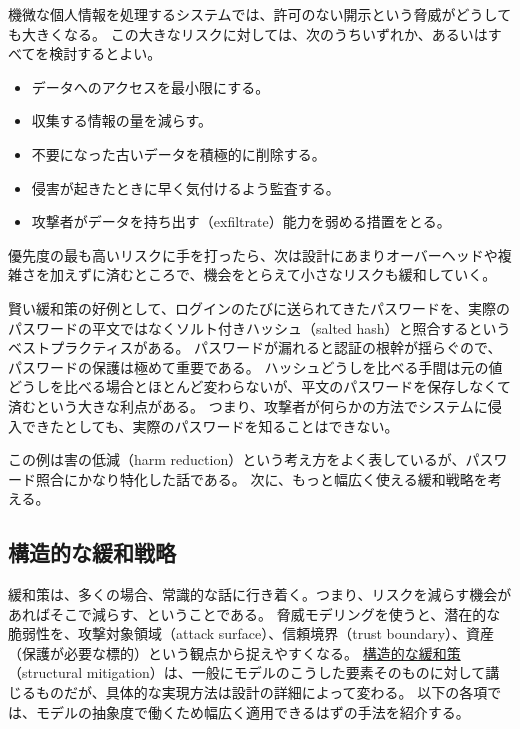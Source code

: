 \documentclass[uplatex]{jsarticle}
\def\label#1{}%
\begin{document}
\begin{exa}[機微な個人情報を扱うシステム]\label{exa:ch3-sensitive-personal-data}
機微な個人情報を処理するシステムでは、許可のない開示という脅威がどうしても大きくなる。
この大きなリスクに対しては、次のうちいずれか、あるいはすべてを検討するとよい。
\begin{itemize}
\item データへのアクセスを最小限にする。
\item 収集する情報の量を減らす。
\item 不要になった古いデータを積極的に削除する。
\item 侵害が起きたときに早く気付けるよう監査する。
\item 攻撃者がデータを持ち出す（exfiltrate）能力を弱める措置をとる。
\end{itemize}
\end{exa}

優先度の最も高いリスクに手を打ったら、次は設計にあまりオーバーヘッドや複雑さを加えずに済むところで、機会をとらえて小さなリスクも緩和していく。

\begin{exa}[ソルト付きハッシュによるパスワード照合]\label{exa:ch3-salted-hash}
賢い緩和策の好例として、ログインのたびに送られてきたパスワードを、実際のパスワードの平文ではなくソルト付きハッシュ（salted hash）と照合するというベストプラクティスがある。
パスワードが漏れると認証の根幹が揺らぐので、パスワードの保護は極めて重要である。
ハッシュどうしを比べる手間は元の値どうしを比べる場合とほとんど変わらないが、平文のパスワードを保存しなくて済むという大きな利点がある。
つまり、攻撃者が何らかの方法でシステムに侵入できたとしても、実際のパスワードを知ることはできない。
\end{exa}

この例は害の低減（harm reduction）という考え方をよく表しているが、パスワード照合にかなり特化した話である。
次に、もっと幅広く使える緩和戦略を考える。

\subsection{構造的な緩和戦略}\label{subsec:ch3-structural-mitigations}

緩和策は、多くの場合、常識的な話に行き着く。つまり、リスクを減らす機会があればそこで減らす、ということである。
脅威モデリングを使うと、潜在的な脆弱性を、攻撃対象領域（attack surface）、信頼境界（trust boundary）、資産（保護が必要な標的）という観点から捉えやすくなる。
\underline{構造的な緩和策}（structural mitigation）は、一般にモデルのこうした要素そのものに対して講じるものだが、具体的な実現方法は設計の詳細によって変わる。
以下の各項では、モデルの抽象度で働くため幅広く適用できるはずの手法を紹介する。
\end{document}
